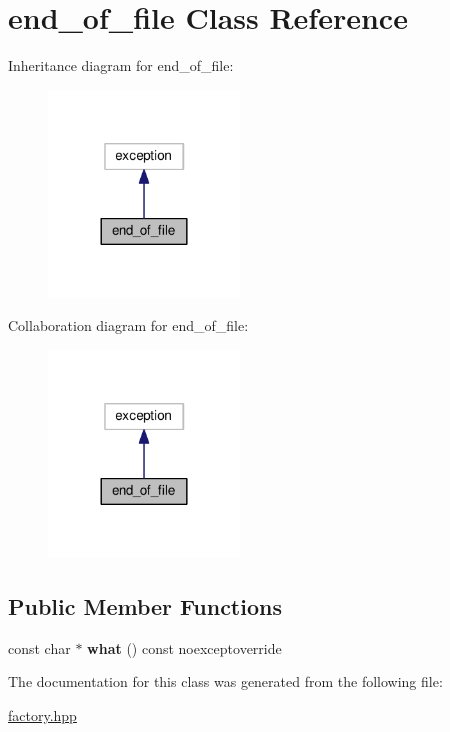 \hypertarget{classend__of__file}{}\section{end\+\_\+of\+\_\+file Class Reference}
\label{classend__of__file}


Inheritance diagram for end\+\_\+of\+\_\+file\+:\nopagebreak
\begin{figure}[H]
\begin{center}
\leavevmode
\includegraphics[width=144pt]{classend__of__file__inherit__graph}
\end{center}
\end{figure}


Collaboration diagram for end\+\_\+of\+\_\+file\+:\nopagebreak
\begin{figure}[H]
\begin{center}
\leavevmode
\includegraphics[width=144pt]{classend__of__file__coll__graph}
\end{center}
\end{figure}
\subsection*{Public Member Functions}
\begin{DoxyCompactItemize}
\item 
const char $\ast$ {\bfseries what} () const noexceptoverride\hypertarget{classend__of__file_a33a76b608ff039611e9f43253b9b462a}{}\label{classend__of__file_a33a76b608ff039611e9f43253b9b462a}

\end{DoxyCompactItemize}


The documentation for this class was generated from the following file\+:\begin{DoxyCompactItemize}
\item 
\hyperlink{factory_8hpp}{factory.\+hpp}\end{DoxyCompactItemize}
